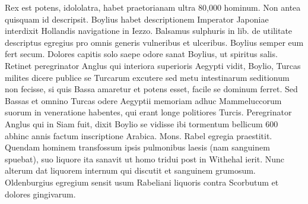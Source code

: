 Rex est potens, idololatra, habet praetorianam  ultra 80,000 hominum. Non antea quisquam id descripsit. Boylius\protect{} habet descriptionem
Imperator Japoniae\protect{} interdixit Hollandis navigatione in Iezzo.
\pend
\newpage
\pstart%
Balsamus sulphuris\protect{}
\protect{}
in lib. de utilitate descriptus egregius pro omnis generis vulneribus et ulceribus.
Boylius\protect{} semper eum fert secum.
Dolores capitis solo saepe odore sanat Boylius\protect{}, ut spiritus salis. Retinet peregrinator Anglus qui interiora superioris Aegypti\protect{} vidit, Boylio\protect{}, Turcas milites dicere publice se
Turcarum excutere sed metu intestinarum seditionum non fecisse, si quis Bassa amaretur et potens esset, facile se dominum ferret. Sed Bassas et omnino Turcas odere Aegyptii memoriam adhuc Mammeluccorum\protect{} suorum in veneratione habentes, qui erant longe politiores Turcis.
\pend%
\pstart%
Peregrinator Anglus qui in Siam\protect{} fuit, dixit Boylio\protect{} se vidisse ibi tormentum bellicum 600 abhinc annis factum inscriptione Arabica.
\pend%
\pstart%
Mons.
Rabel\protect{} egregia praestitit. Quendam hominem transfossum ipsis pulmonibus laesis (nam sanguinem spuebat), suo liquore ita sanavit ut homo tridui post in Withe\-hal\protect{} ierit. Nunc alterum dat liquorem internum qui discutit et sanguinem grumosum. Oldenburgius\protect{} egregium sensit usum \protect{}Rabeliani liquoris contra Scorbutum\protect{} et dolores gingivarum.

